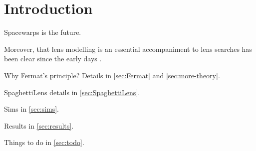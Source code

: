 \section{Introduction}

Spacewarps is the future.

Moreover, that lens modelling is an essential accompaniment to lens
searches has been clear since the early days \citep{1981ApJ...244..723Y}.

Why Fermat's principle?  Details in \ref{sec:Fermat} and
\ref{sec:more-theory}.

SpaghettiLens details in \ref{sec:SpaghettiLens}.

Sims in \ref{sec:sims}.

Results in \ref{sec:results}.

Things to do in \ref{sec:todo}.